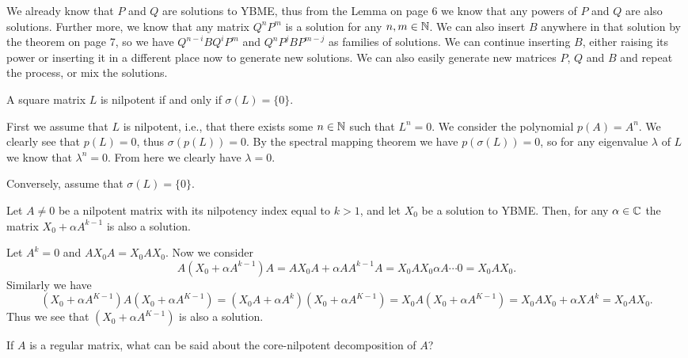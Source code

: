 \documentclass{article}
\begin{document}
\begin{solution}
  We already know that $P$ and $Q$ are solutions to YBME, thus from the Lemma on page 6 we know that any powers of $P$ and $Q$ are also solutions.
  Further more, we know that any matrix $Q^n P^m$ is a solution for any $n, m \in \mathbb{N}$.
  We can also insert $B$ anywhere in that solution by the theorem on page 7, so we have $Q^{n - i} B Q^i P^m$ and $Q^n P^j B P^{m - j}$ as families of solutions.
  We can continue inserting $B$, either raising its power or inserting it in a different place now to generate new solutions.
  We can also easily generate new matrices $P$, $Q$ and $B$ and repeat the process, or mix the solutions.
\end{solution}

\begin{problem}
  A square matrix $L$ is nilpotent if and only if $\sigma(L) = \{0\}$.
\end{problem}

\begin{solution}
  First we assume that $L$ is nilpotent, i.e., that there exists some $n \in \mathbb{N}$ such that $L^n = 0$.
  We consider the polynomial $p(A) = A^n$.
  We clearly see that $p(L) = 0$, thus $\sigma(p(L)) = 0$.
  By the spectral mapping theorem we have $p(\sigma(L)) = 0$, so for any eigenvalue $\lambda$ of $L$ we know that $\lambda^n = 0$.
  From here we clearly have $\lambda = 0$.
  
  Conversely, assume that $\sigma(L) = \{0\}$.
\end{solution}

\begin{problem}
  Let $A \neq 0$ be a nilpotent matrix with its nilpotency index equal to $k > 1$, and let $X_0$ be a solution to YBME.
  Then, for any $\alpha \in \mathbb{C}$ the matrix $X_0 + \alpha A^{k - 1}$ is also a solution.
\end{problem}

\begin{solution}
  Let $A^k = 0$ and $A X_0 A = X_0 A X_0$.
  Now we consider
  \[A (X_0 + \alpha A^{k - 1}) A = A X_0 A + \alpha A A^{k - 1} A = X_0 A X_0 \alpha A \cdots 0 = X_0 A X_0.\]
  Similarly we have
  \[(X_0 + \alpha A^{K - 1}) A (X_0 + \alpha A^{K - 1}) = (X_0 A + \alpha A^k) (X_0 + \alpha A^{K - 1}) = X_0 A (X_0 + \alpha A^{K - 1}) = X_0 A X_0 + \alpha X A^k = X_0 A X_0.\]
  Thus we see that $(X_0 + \alpha A^{K - 1})$ is also a solution.
\end{solution}

\begin{problem}
  If $A$ is a regular matrix, what can be said about the core-nilpotent decomposition of $A$?
\end{problem}
\end{document}
